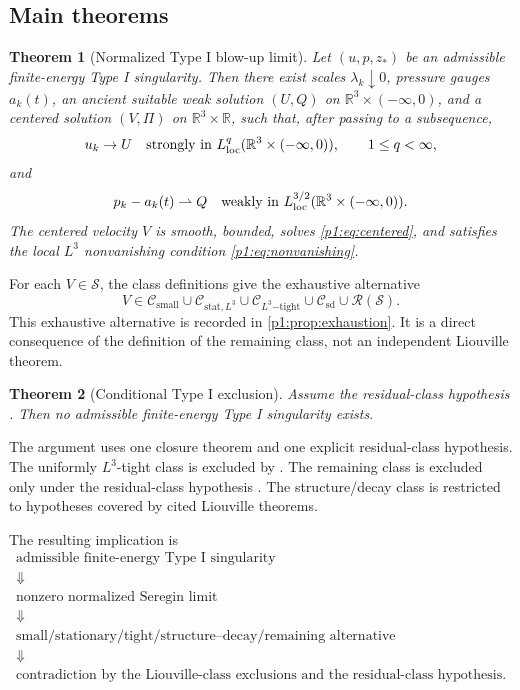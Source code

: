 \documentclass[11pt]{amsart}
\theoremstyle{plain}
\newtheorem{theorem}{Theorem}[section]
\theoremstyle{definition}
\theoremstyle{remark}
\numberwithin{equation}{section}
\newcommand{\R}{\mathbb R}
\newcommand{\loc}{\mathrm{loc}}
\newcommand{\calS}{\mathcal S}
\newcommand{\calR}{\mathcal R}
\newcommand{\calC}{\mathcal C}
\begin{document}
\subsection{Main theorems}

\begin{theorem}[Normalized Type I blow-up limit]\label{p1:thm:extraction}
Let \((u,p,z_*)\) be an admissible finite-energy Type I singularity.  Then
there exist scales \(\lambda_k\downarrow0\), pressure gauges \(a_k(t)\), an
ancient suitable weak solution \((U,Q)\) on
\(\R^3\times(-\infty,0)\), and a centered solution \((V,\Pi)\) on
\(\R^3\times\R\), such that, after passing to a subsequence,
\[
   u_k\to U
   \quad\hbox{strongly in }L^q_{\loc}(\R^3\times(-\infty,0)),
   \qquad 1\le q<\infty,
\]
and
\[
   p_k-a_k(t)\rightharpoonup Q
   \quad\hbox{weakly in }L^{3/2}_{\loc}(\R^3\times(-\infty,0)).
\]
The centered velocity \(V\) is smooth, bounded, solves \eqref{p1:eq:centered}, and
satisfies the local \(L^3\) nonvanishing condition \eqref{p1:eq:nonvanishing}.
\end{theorem}

For each \(V\in\calS\), the class definitions give the exhaustive alternative
\[
   V\in
   \calC_{\mathrm{small}}
   \cup
   \calC_{\mathrm{stat},L^3}
   \cup
   \calC_{L^3\mathrm{-tight}}
   \cup
   \calC_{\mathrm{sd}}
   \cup
   \calR(\calS).
\]
This exhaustive alternative is recorded in \cref{p1:prop:exhaustion}.  It is a
direct consequence of the definition of the remaining class, not an
independent Liouville theorem.

\begin{theorem}[Conditional Type I exclusion]
\label{p1:thm:remaining-criterion}
Assume the residual-class hypothesis .  Then no
admissible finite-energy Type I singularity exists.
\end{theorem}

The argument uses one closure theorem and one explicit residual-class
hypothesis.  The uniformly \(L^3\)-tight class is excluded by
.
The remaining class is excluded only under the residual-class hypothesis
.  The structure/decay
class is restricted to hypotheses covered by cited Liouville theorems.

The resulting implication is
\[
\begin{array}{c}
\text{admissible finite-energy Type I singularity}
\\
\Downarrow
\\
\text{nonzero normalized Seregin limit}
\\
\Downarrow
\\
\text{small/stationary/tight/structure--decay/remaining alternative}
\\
\Downarrow
\\
\text{contradiction by the Liouville-class exclusions and the residual-class hypothesis.}
\end{array}
\]
\end{document}
